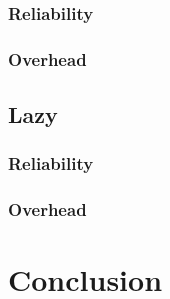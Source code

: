                 \subsubsection{Reliability}
                \subsubsection{Overhead}
            \subsection{Lazy}
                \subsubsection{Reliability}
                \subsubsection{Overhead}

\section{Conclusion}
